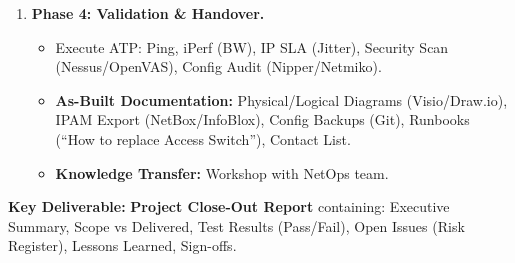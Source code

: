 \documentclass[11pt]{article}
\begin{document}
\begin{methode}
\begin{enumerate}
\begin{itemize}
        \item \textbf{Lab Staging:} Pre-config devices, burn-in (48h), upgrade firmware to approved baseline.
        \item \textbf{Pilot:} One non-critical site / VLAN. Monitor $48$h.
        \item \textbf{Phased Rollout:} Site-by-site or Module-by-module (Core $\rightarrow$ Dist $\rightarrow$ Access). Rollback plan per step ($< 30$ min).
        \item \textbf{Change Management:} RFC per site, CAB approval, Post-Implementation Review (PIR).
    \end{itemize}
    \item \textbf{Phase 4: Validation \& Handover.}
    \begin{itemize}
        \item Execute ATP: Ping, iPerf (BW), IP SLA (Jitter), Security Scan (Nessus/OpenVAS), Config Audit (Nipper/Netmiko).
        \item \textbf{As-Built Documentation:} Physical/Logical Diagrams (Visio/Draw.io), IPAM Export (NetBox/InfoBlox), Config Backups (Git), Runbooks (``How to replace Access Switch''), Contact List.
        \item \textbf{Knowledge Transfer:} Workshop with NetOps team.
    \end{itemize}
\end{enumerate}
\textbf{Key Deliverable:} \textbf{Project Close-Out Report} containing: Executive Summary, Scope vs Delivered, Test Results (Pass/Fail), Open Issues (Risk Register), Lessons Learned, Sign-offs.
\end{methode}
\end{document}
